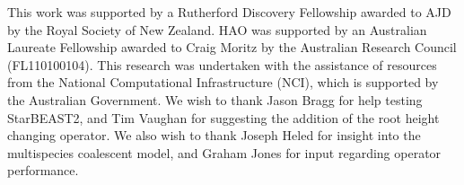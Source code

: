 \documentclass[12pt]{article}
\begin{document}
This work was supported by a Rutherford Discovery Fellowship awarded to AJD by
the Royal Society of New Zealand. HAO was supported by an Australian Laureate
Fellowship awarded to Craig Moritz by the Australian Research Council
(FL110100104). This research was undertaken with the assistance of resources
from the National Computational Infrastructure (NCI), which is supported by the
Australian Government. We wish to thank Jason Bragg for help testing StarBEAST2,
and Tim Vaughan for suggesting the addition of the root height changing
operator. We also wish to thank Joseph Heled for insight into the multispecies
coalescent model, and Graham Jones for input regarding operator performance.



\end{document}
